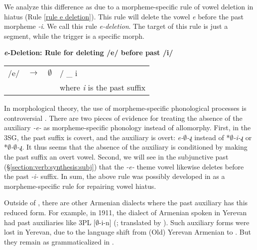 We analyze this difference as due to a morpheme-specific rule of vowel deletion in hiatus (Rule \ref{rule e deletion}). This rule will delete the vowel \textit{{e}} before the past morpheme \textit{{-i}}. We call this rule \textit{e-deletion}. The target of this rule is just a segment, while the trigger is a specific morph. 

\vfill
\begin{newruleblock}{\textbf{\textit{e}-Deletion:   Rule for deleting  /{e}/  before past  /{i}/}}%
	\begin{center}
		\begin{tabular}{lll l}
			/{e}/ & $\rightarrow$ & $\emptyset$ & / \_ {i}
			\\
			& & & where \textit{i} is the past suffix
		\end{tabular}
	\end{center}
\end{newruleblock}
\vfill\pagebreak

In morphological theory, the use of morpheme-specific phonological processes is controversial \citep{Pater-2007-LocusExceptionalityMorphemeSpecificConstraitnIndexation,siddiqi-2009-syntaxWithinWordEconomyAllomorphyArgumentSeelctionDistributedMorphology,haugenSiddiqi-2016-towardsRestrictedTheoryMultimorphemicMonolistemicityPortmanteauxPostLinearizationSpanning,Haugen-2016-ReadjustmentRejected,EmbickSchwayer-MorphoPhonoMisapplications}. There are two pieces of evidence for treating the absence of the auxiliary \textit{{-e-}} as morpheme-specific phonology instead of allomorphy. First, in the 3SG, the past suffix is covert, and the auxiliary is overt: \textit{{e-$\emptyset$-ɻ}} instead of *\textit{{$\emptyset$-i-ɻ}} or *\textit{{$\emptyset$-$\emptyset$-ɻ}}. It thus seems that the absence of the auxiliary is conditioned by making the past suffix an overt vowel. Second, we will see in the subjunctive past (\S\ref{section:verb:synthesis:subj})  that the \textit{{-e-}} theme vowel likewise deletes before the past \textit{{-i-}} suffix. In sum, the above rule was possibly developed in {\iaIA} as a morpheme-specific rule for repairing vowel hiatus. 


Outside of {\iaIA}, there are other Armenian dialects where the past auxiliary has this reduced form. For example, in 1911, the dialect of Armenian spoken in Yerevan had past auxiliaries like 3PL [$\emptyset$-i-n]  (\citealt[43]{Adjarian-1911-DialectologyBook}; translated by \citealt{Dolatian-prep-Adjarian}). Such auxiliary forms were lost in Yerevan, due to the language shift from (Old) Yerevan Armenian to {\seaSEA}. But they remain as grammaticalized in {\iaIA}. 

